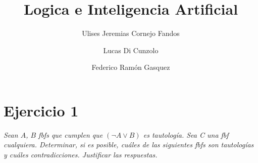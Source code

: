 \documentclass[osajnl,twocolumn,showpacs,superscriptaddress,10pt]{revtex4-1} %
\begin{document}
\title{Logica e Inteligencia Artificial}

\author{Ulises Jeremias Cornejo Fandos}

\author{Lucas Di Cunzolo}

\author{Federico Ramón Gasquez}



\maketitle %

\onecolumngrid

\section{Ejercicio 1}

\textit{Sean $A$, $B$ fbfs que cumplen que $(\neg A \vee B)$ es tautología. Sea C una fbf cualquiera. Determinar, si es posible, cuáles de las siguientes fbfs son tautologías y cuáles contradicciones. Justificar las respuestas.} \\
\end{document}
